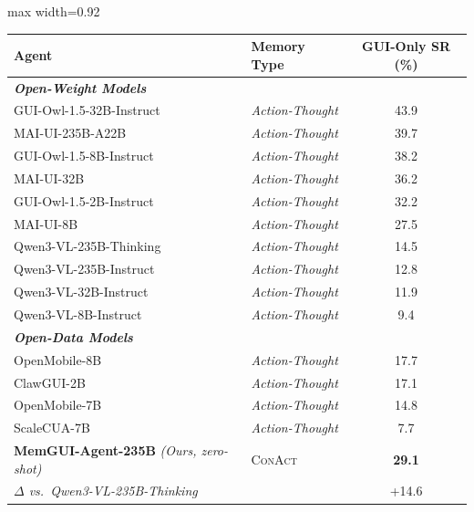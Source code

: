 \documentclass{llmxive}
\providecommand{\ourmethod}{MemGUI-Agent\xspace}
\providecommand{\conact}{\textsc{ConAct}\xspace}
\providecommand{\rise}[1]{#1}
\providecommand{\arraystretch}{1.06}
\begin{document}
\begin{table}[!htbp]
  \centering
  \footnotesize
  \renewcommand{\arraystretch}{1.06}
  \setlength{\tabcolsep}{4pt}
  \begin{adjustbox}{max width=0.92\linewidth}
  \begin{tabular}{@{}l l c@{}}
    \toprule
    \textbf{Agent} & \textbf{Memory Type} & \textbf{GUI-Only SR (\%)} \\
    \midrule
    \multicolumn{3}{l}{\textit{\textbf{Open-Weight Models}}} \\
    \midrule
    GUI-Owl-1.5-32B-Instruct~\cite{xu2026mobile} & \textit{Action-Thought} & 43.9 \\
    MAI-UI-235B-A22B~\cite{zhou2025mai} & \textit{Action-Thought} & 39.7 \\
    GUI-Owl-1.5-8B-Instruct~\cite{xu2026mobile} & \textit{Action-Thought} & 38.2 \\
    MAI-UI-32B~\cite{zhou2025mai} & \textit{Action-Thought} & 36.2 \\
    GUI-Owl-1.5-2B-Instruct~\cite{xu2026mobile} & \textit{Action-Thought} & 32.2 \\
    MAI-UI-8B~\cite{zhou2025mai} & \textit{Action-Thought} & 27.5 \\
    Qwen3-VL-235B-Thinking~\cite{bai2025qwen3} & \textit{Action-Thought} & 14.5 \\
    Qwen3-VL-235B-Instruct~\cite{bai2025qwen3} & \textit{Action-Thought} & 12.8 \\
    Qwen3-VL-32B-Instruct~\cite{bai2025qwen3} & \textit{Action-Thought} & 11.9 \\
    Qwen3-VL-8B-Instruct~\cite{bai2025qwen3} & \textit{Action-Thought} & 9.4 \\
    \midrule
    \multicolumn{3}{l}{\textit{\textbf{Open-Data Models}}} \\
    \midrule
    OpenMobile-8B~\cite{OpenMobile2025} & \textit{Action-Thought} & 17.7 \\
    ClawGUI-2B~\cite{tang2026clawgui} & \textit{Action-Thought} & 17.1 \\
    OpenMobile-7B~\cite{OpenMobile2025} & \textit{Action-Thought} & 14.8 \\
    ScaleCUA-7B~\cite{ScaleCUA2025} & \textit{Action-Thought} & 7.7 \\
    \midrule
    \addlinespace[2pt]
    \rowcolor{oursrowcolor} \textbf{\ourmethod-235B} \textit{(Ours, zero-shot)} & \conact & \textbf{29.1} \\
    \multicolumn{2}{l}{\quad\textit{\footnotesize $\Delta$ vs.\ Qwen3-VL-235B-Thinking}} & {\footnotesize\rise{+14.6}} \\

\end{tabular}
\end{adjustbox}
\end{table}
\end{document}
